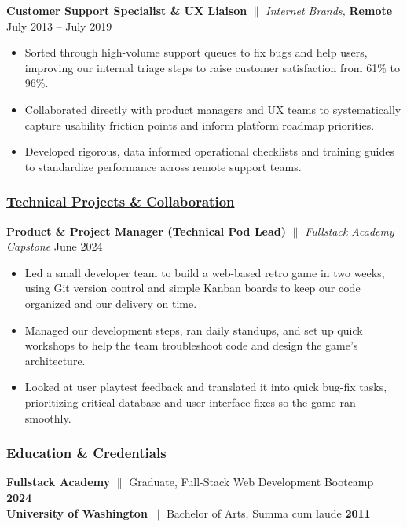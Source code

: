\documentclass[a4paper,10pt]{article}
\begin{document}
{\textbf{Customer Support Specialist \& UX Liaison} $\parallel$ \textit{Internet Brands,}  \textbf{Remote} \hfill {July 2013 – July 2019}}
\begin{itemize}
      \item Sorted through high-volume support queues to fix bugs and help users, improving our internal triage steps to raise customer satisfaction from 61\% to 96\%.
      \item Collaborated directly with product managers and UX teams to systematically capture usability friction points and inform platform roadmap priorities.
      \item Developed rigorous, data informed operational checklists and training guides to standardize performance across remote support teams.
    \end{itemize}

\subsubsection{\underline{Technical Projects \& Collaboration}}
{\textbf{Product \& Project Manager (Technical Pod Lead)} $\parallel$ \textit{Fullstack Academy Capstone} \hfill {June 2024}}
\begin{itemize}
      \item Led a small developer team to build a web-based retro game in two weeks, using Git version control and simple Kanban boards to keep our code organized and our delivery on time.
      \item Managed our development steps, ran daily standups, and set up quick workshops to help the team troubleshoot code and design the game's architecture.
      \item Looked at user playtest feedback and translated it into quick bug-fix tasks, prioritizing critical database and user interface fixes so the game ran smoothly.
\end{itemize}

\subsubsection{\underline{Education \& Credentials}}
\textbf{Fullstack Academy} $\parallel$ Graduate, Full-Stack Web Development Bootcamp \hfill \textbf{2024} \\
\textbf{University of Washington} $\parallel$ Bachelor of Arts, Summa cum laude \hfill \textbf{2011}
\end{document}

